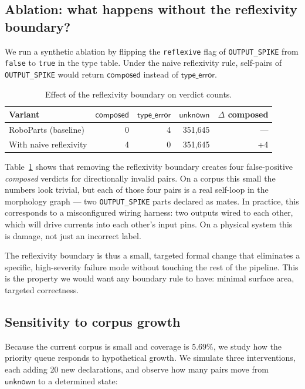 \subsection{Ablation: what happens without the reflexivity boundary?}

We run a synthetic ablation by flipping the \texttt{reflexive} flag
of \texttt{OUTPUT\_SPIKE} from \texttt{false} to \texttt{true} in
the type table. Under the naive reflexivity rule, self-pairs of
\texttt{OUTPUT\_SPIKE} would return $\mathsf{composed}$ instead of
$\mathsf{type\_error}$.

\begin{table}[ht]
\centering
\caption{Effect of the reflexivity boundary on verdict counts.}
\label{tab:ablation}
\begin{tabular}{@{}lrrrr@{}}
\toprule
Variant               & $\mathsf{composed}$ & $\mathsf{type\_error}$ & $\mathsf{unknown}$ & $\Delta$ composed \\
\midrule
RoboParts (baseline)  & 0    & 4    & 351{,}645 & --- \\
With naive reflexivity & 4    & 0    & 351{,}645 & +4 \\
\bottomrule
\end{tabular}
\end{table}

Table~\ref{tab:ablation} shows that removing the reflexivity boundary
creates four false-positive \emph{composed} verdicts for directionally
invalid pairs. On a corpus this small the numbers look trivial, but
each of those four pairs is a real self-loop in the morphology graph
— two \texttt{OUTPUT\_SPIKE} parts declared as mates. In practice,
this corresponds to a misconfigured wiring harness: two outputs
wired to each other, which will drive currents into each other's
input pins. On a physical system this is damage, not just an
incorrect label.

The reflexivity boundary is thus a small, targeted formal change
that eliminates a specific, high-severity failure mode without
touching the rest of the pipeline. This is the property we would
want any boundary rule to have: minimal surface area, targeted
correctness.

\subsection{Sensitivity to corpus growth}

Because the current corpus is small and coverage is $5.69\%$,
we study how the priority queue responds to hypothetical growth.
We simulate three interventions, each adding 20 new declarations,
and observe how many pairs move from $\mathsf{unknown}$ to a
determined state:


